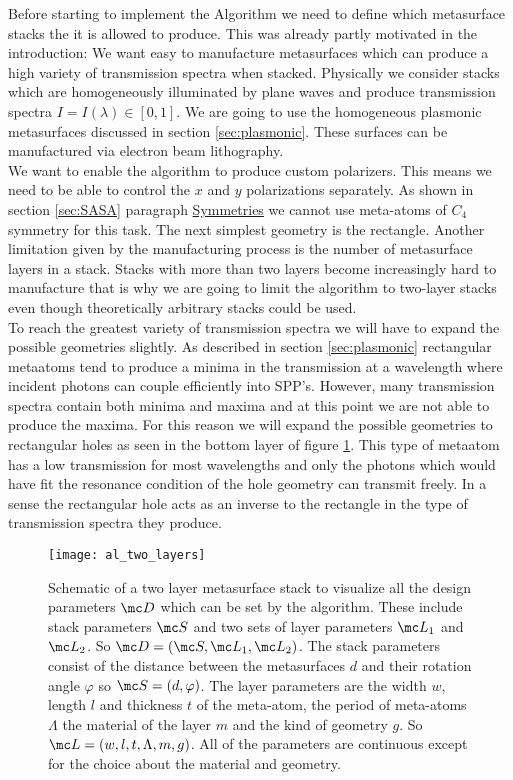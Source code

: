 Before starting to implement the Algorithm we need to define which metasurface stacks the it is allowed to produce. This was already partly motivated in the introduction: We want easy to manufacture metasurfaces which can produce a high variety of transmission spectra when stacked.
Physically we consider stacks which are homogeneously illuminated by plane waves and produce transmission spectra $I = I(\lambda) \in [0,1]$.
We are going to use the homogeneous plasmonic metasurfaces discussed in section \ref{sec:plasmonic}. These surfaces can be manufactured via electron beam lithography.
\\

\indent
We want to enable the algorithm to produce custom polarizers. This means we need to be able to control the $x$ and $y$ polarizations separately. 
As shown in section \ref{sec:SASA} paragraph \hyperref[sec:symmetries]{Symmetries} we cannot use meta-atoms of $C_4$ symmetry for this task. The next simplest geometry is the rectangle. Another limitation given by the manufacturing process is the number of metasurface layers in a stack. Stacks with more than two layers become increasingly hard to manufacture that is why we are going to limit the algorithm to two-layer stacks even though theoretically arbitrary stacks could be used.
\\

\indent
To reach the greatest variety of transmission spectra we will have to expand the possible geometries slightly. As described in section \ref{sec:plasmonic} rectangular metaatoms tend to produce a minima in the transmission at a wavelength where incident photons can couple efficiently into SPP's. However, many transmission spectra contain both minima and maxima and at this point we are not able to produce the maxima. For this reason we will expand the possible geometries to rectangular holes as seen in the bottom layer of figure \ref{fig:al:two_layers}. This type of metaatom has a low transmission for most wavelengths and only the photons which would have fit the resonance condition of the hole geometry can transmit freely. In a sense the rectangular hole acts as an inverse to the rectangle in the type of transmission spectra they produce.


\begin{figure}[H]
    \centering
    \texttt{[image: al\_two\_layers]}
    \caption{Schematic of a two layer metasurface stack to visualize all the design parameters
    $\mc D$ which can be set by the algorithm. These include stack parameters $\mc S$ and two sets of layer parameters $\mc L_1$ and $\mc L_2$.
    So ${\mc D = (\mc S, \mc L_1, \mc L_2)}$. The stack parameters consist of the distance between the metasurfaces $d$ and their rotation angle $\varphi$ so $\mc S = (d, \varphi)$. The layer parameters are the width $w$, length $l$ and thickness $t$ of the meta-atom, the period of meta-atoms $\Lambda$ the  material of the layer $m$ and the kind of geometry $g$. So $\mc L = (w,l,t,\Lambda,m,g)$. All of the parameters are continuous except for the choice about the material and geometry.}
    \label{fig:al:two_layers}
\end{figure}


